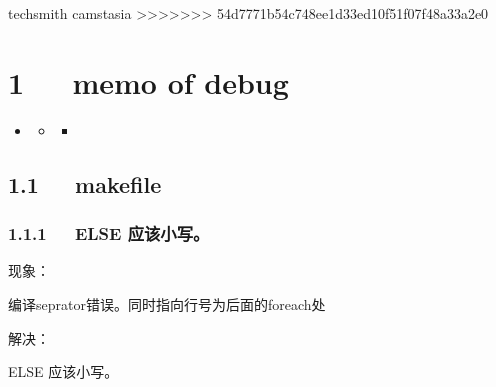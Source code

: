 \documentclass[letterpaper,12pt,english]{sphinxmanual}
\begin{document}
techsmith camstasia
>>>>>>> 54d7771b54c748ee1d33ed10f51f07f48a33a2e0


\chapter{1   memo of debug}
\label{\detokenize{000misc/memo-debug:memo-of-debug}}\label{\detokenize{000misc/memo-debug::doc}}
\begin{sphinxShadowBox}
\begin{itemize}
\item {} 
\label{\detokenize{000misc/memo-debug:id2}}{\hyperref[\detokenize{000misc/memo-debug:memo-of-debug}]{}}
\begin{itemize}
\item {} 
\label{\detokenize{000misc/memo-debug:id3}}{\hyperref[\detokenize{000misc/memo-debug:makefile}]{}}
\begin{itemize}
\item {} 
\label{\detokenize{000misc/memo-debug:id4}}{\hyperref[\detokenize{000misc/memo-debug:else}]{}}

\end{itemize}

\end{itemize}

\end{itemize}
\end{sphinxShadowBox}


\section{1.1   makefile}
\label{\detokenize{000misc/memo-debug:makefile}}

\subsection{1.1.1   ELSE 应该小写。}
\label{\detokenize{000misc/memo-debug:else}}
现象：

编译seprator错误。同时指向行号为后面的foreach处

解决：

ELSE 应该小写。
\end{document}
